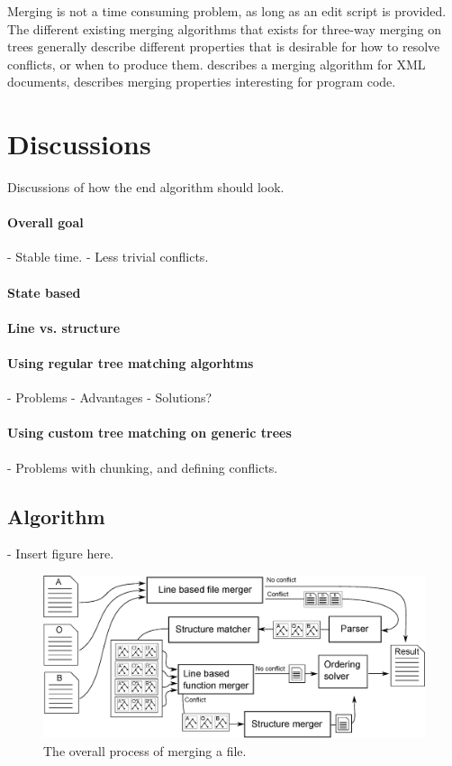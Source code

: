 \documentclass[11pt]{article}
\begin{document}
Merging is not a time consuming problem, as long as an edit script is provided. The different existing merging algorithms that exists for three-way merging on trees generally describe different properties that is desirable for how to resolve conflicts, or when to produce them. \citet{lindholm} describes a merging algorithm for XML documents, \citet{Horwitz,Asklund,Olav} describes merging properties interesting for program code.

\clearpage

\section{Discussions}
Discussions of how the end algorithm should look.

\paragraph{Overall goal}
- Stable time.
- Less trivial conflicts.
\paragraph{State based}
\paragraph{Line vs. structure}
\paragraph{Using regular tree matching algorhtms}
- Problems
- Advantages
- Solutions?
\paragraph{Using custom tree matching on generic trees}
- Problems with chunking, and defining conflicts.

\subsection{Algorithm}
- Insert figure here.
\begin{figure}
   \centerline{\includegraphics[scale=0.55]{drawings/eps/overallmergingprocess.eps}}
   \caption{The overall process of merging a file.}
   \label{OverallMergingProcess}
\end{figure}
\end{document}
